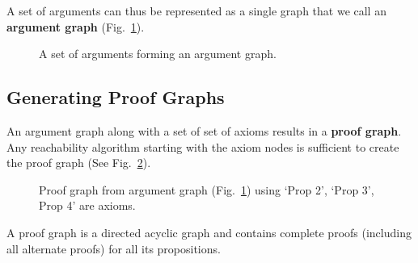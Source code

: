 \documentclass[runningheads]{llncs}
\begin{document}
A set of arguments can thus be represented as a single graph that we call an \textbf{argument graph} (Fig.~\ref{argument_graph}).

\begin{figure}[!ht]
\begin{center}
\caption{A set of arguments forming an argument graph.}
\label{argument_graph}
\end{center}
\end{figure}


\subsection{Generating Proof Graphs}
An argument graph along with a set of set of axioms results in a \textbf{proof graph}. Any reachability algorithm starting with the axiom nodes is sufficient to create the proof graph (See Fig.~\ref{proof_graph1}).


\begin{figure}[!ht] 
\begin{center}
\caption{Proof graph from argument graph (Fig.~\ref{argument_graph}) using `Prop 2', `Prop 3', Prop 4' are axioms.}
\label{proof_graph1}
\end{center}
\end{figure}


A proof graph is a directed acyclic graph and contains complete proofs (including all alternate proofs) for all its propositions.
\end{document}
